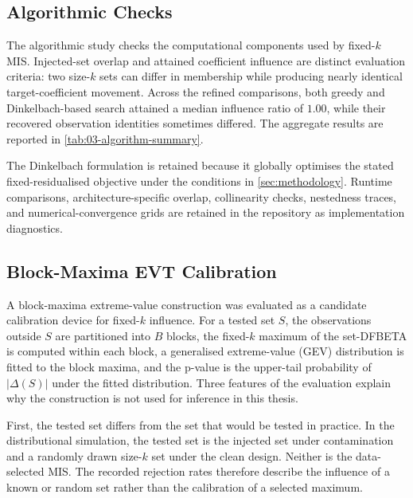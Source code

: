 \documentclass[../main.tex]{subfiles}
\begin{document}


\FloatBarrier
\subsection{Algorithmic Checks}
\label{app:numerical}

The algorithmic study checks the computational components used by fixed-\(k\) MIS. Injected-set overlap and attained coefficient influence are distinct evaluation criteria: two size-\(k\) sets can differ in membership while producing nearly identical target-coefficient movement. Across the refined comparisons, both greedy and Dinkelbach-based search attained a median influence ratio of \(1.00\), while their recovered observation identities sometimes differed. The aggregate results are reported in \autoref{tab:03-algorithm-summary}.



The Dinkelbach formulation is retained because it globally optimises the stated fixed-residualised objective under the conditions in \autoref{sec:methodology}. Runtime comparisons, architecture-specific overlap, collinearity checks, nestedness traces, and numerical-convergence grids are retained in the repository as implementation diagnostics.

\FloatBarrier
\subsection{Block-Maxima EVT Calibration}
\label{app:evt}

A block-maxima extreme-value construction \parencite{konrad2026testing} was evaluated as a candidate calibration device for fixed-\(k\) influence. For a tested set \(S\), the observations outside \(S\) are partitioned into \(B\) blocks, the fixed-\(k\) maximum of the set-DFBETA is computed within each block, a generalised extreme-value (GEV) distribution is fitted to the block maxima, and the p-value is the upper-tail probability of \(|\Delta(S)|\) under the fitted distribution. Three features of the evaluation explain why the construction is not used for inference in this thesis.

First, the tested set differs from the set that would be tested in practice. In the distributional simulation, the tested set is the injected set under contamination and a randomly drawn size-\(k\) set under the clean design. Neither is the data-selected MIS. The recorded rejection rates therefore describe the influence of a known or random set rather than the calibration of a selected maximum.
\end{document}
